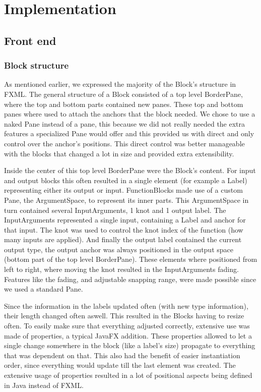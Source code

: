 \chapter{Implementation}
\label{chap:implementation}

\section{Front end}
\subsection{Block structure}
As mentioned earlier, we expressed the majority of the Block's structure in FXML. The general structure of a Block consisted of a top level BorderPane, where the top and bottom parts contained new panes. These top and bottom panes where used to attach the anchors that the block needed. We chose to use a naked Pane instead of a pane, this because we did not really needed the extra features a specialized Pane would offer and this provided us with direct and only control over the anchor's positions. This direct control was better manageable with the blocks that changed a lot in size and provided extra extensibility.

Inside the center of this top level BorderPane were the Block's content. For input and output blocks this often resulted in a single element (for example a Label) representing either its output or input. FunctionBlocks made use of a custom Pane, the ArgumentSpace, to represent its inner parts. This ArgumentSpace in turn contained several InputArguments, 1 knot and 1 output label. The InputArguments represented a single input, containing a Label and anchor for that input. The knot was used to control the knot index of the function (how many inputs are applied). And finally the output label contained the current output type, the output anchor was always positioned in the output space (bottom part of the top level BorderPane). These elements where positioned from left to right, where moving the knot resulted in the InputArguments fading. Features like the fading, and adjustable snapping range, were made possible since we used a standard Pane.

Since the information in the labels updated often (with new type information), their length changed often aswell. This resulted in the Blocks having to resize often. To easily make sure that everything adjusted correctly, extensive use was made of properties, a typical JavaFX addition. These properties allowed to let a single change somewhere in the block (like a label's size) propagate to everything that was dependent on that. This also had the benefit of easier instantiation order, since everything would update till the last element was created. The extensive usage of properties resulted in a lot of positional aspects being defined in Java instead of FXML.

